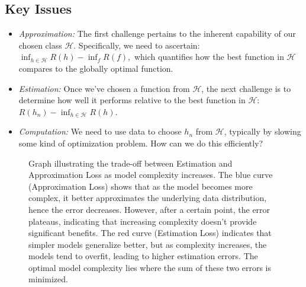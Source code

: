 \documentclass[11pt]{article}
\begin{document}
    \subsection{Key Issues}

    \begin{itemize}
        \item \textit{Approximation:} The first challenge pertains to the inherent capability of our chosen class $\mathcal{H}$. Specifically, we need to ascertain:
        $
        \inf_{h \in \mathcal{H}} R(h) - \inf_{f} R(f),
        $
        which quantifies how the best function in $\mathcal{H}$ compares to the globally optimal function.

        \item \textit{Estimation:} Once we've chosen a function from $\mathcal{H}$, the next challenge is to determine how well it performs relative to the best function in $\mathcal{H}$:
        $
        R(h_n) - \inf_{h \in \mathcal{H}} R(h).
        $

        \item \textit{Computation:} We need to use data to choose $h_n$ from $\mathcal{H}$, typically by slowing some kind of optimization problem. How can we do this efficiently?
    \end{itemize}

    \begin{figure}[h]
        \centering
        \caption{Graph illustrating the trade-off between Estimation and Approximation Loss as model complexity increases. The blue curve (Approximation Loss) shows that as the model becomes more complex, it better approximates the underlying data distribution, hence the error decreases. However, after a certain point, the error plateaus, indicating that increasing complexity doesn't provide significant benefits. The red curve (Estimation Loss) indicates that simpler models generalize better, but as complexity increases, the models tend to overfit, leading to higher estimation errors. The optimal model complexity lies where the sum of these two errors is minimized.}
        \label{fig:est-app}
    \end{figure}
\end{document}
